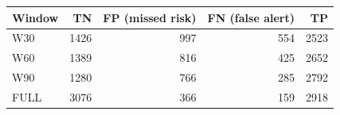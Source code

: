 \small
\setlength{\tabcolsep}{4pt}
\begin{tabular}{@{}lrrrr@{}}
\toprule
Window & TN & FP (missed risk) & FN (false alert) & TP \\
\midrule
W30 & 1426 & 997 & 554 & 2523 \\
W60 & 1389 & 816 & 425 & 2652 \\
W90 & 1280 & 766 & 285 & 2792 \\
FULL & 3076 & 366 & 159 & 2918 \\
\bottomrule
\end{tabular}
